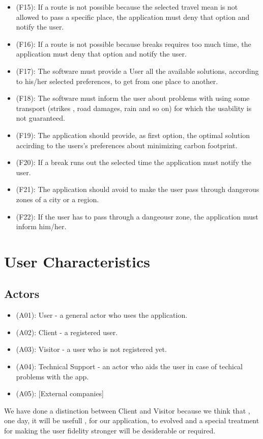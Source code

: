 \documentclass[a4paper,leqno]{book}
\begin{document}
\begin{itemize}
	\item (F15): If a route is not possible because the selected travel mean is not allowed to pass a specific place, the application must deny that option and notify the user.
	\item (F16): If a route is not possible because breaks requires too much time, the application must deny that option and notify the user.
	\item (F17): The software must provide a User all the available solutions, according to his/her selected preferences, to get from one place to another.
	\item (F18): The software must inform the user about problems with using some transport (strikes , road damages, rain and so on) for which the usability is not guaranteed.
	\item (F19): The application should provide, as first option, the optimal solution accirding to the users's preferences about minimizing carbon footprint.
	\item (F20): If a break runs out the selected time the application must notify the user.
	\item (F21): The application should avoid to make the user pass through dangerous zones of a city or a region.
	\item (F22): If the user has to pass through a dangeousr zone, the application must inform him/her.
\end{itemize}

\section{User Characteristics}
\subsection{Actors}
\begin{itemize}
	\item (A01): User - a general actor who uses the application.
		\item (A02): Client - a registered user.
		\item (A03): Visitor - a user who is not registered yet.
	\item (A04): Technical Support - an actor who aids the user in case of techical problems with the app.
	\item (A05): [External companies]
\end{itemize}

We have done a distinction between Client and Visitor because we think that , one day, 
it will be usefull , for our application, to evolved and a special treatment for making the 
user fidelity stronger will be desiderable or required.
\end{document}

